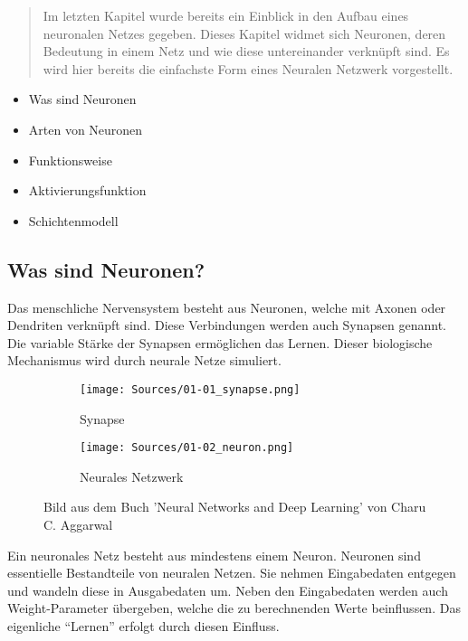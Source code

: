 \begin{tcolorbox}[title={Inhalt}]
    \begin{quotation}\noindent
        Im letzten Kapitel wurde bereits ein Einblick in den Aufbau eines neuronalen Netzes gegeben. 
        Dieses Kapitel widmet sich Neuronen, deren Bedeutung in einem Netz und wie diese untereinander verknüpft sind.
        Es wird hier bereits die einfachste Form eines Neuralen Netzwerk vorgestellt.
    \end{quotation}
\begin{itemize} 
    \item Was sind Neuronen
    \item Arten von Neuronen
    \item Funktionsweise
    \item Aktivierungsfunktion
    \item Schichtenmodell
\end{itemize} 
\end{tcolorbox}
\subsection{Was sind Neuronen?}\label{sec:neuronen:was_sind_neuronen}  
Das menschliche Nervensystem besteht aus Neuronen, welche mit Axonen oder Dendriten verknüpft sind. Diese Verbindungen werden auch Synapsen genannt. Die variable Stärke der Synapsen
ermöglichen das Lernen. Dieser biologische Mechanismus wird durch neurale Netze simuliert.\\

\begin{figure}[H]
\begin{subfigure}{0.6\textwidth}
    \texttt{[image: Sources/01-01\_synapse.png]}
    \label{Synapse}
    \caption{Synapse}
\end{subfigure}
\begin{subfigure}{0.25\textwidth}
    \texttt{[image: Sources/01-02\_neuron.png]}
    \label{Neuron}
    \caption{Neurales Netzwerk}
\end{subfigure}
\caption{Bild aus dem Buch 'Neural Networks and Deep Learning' von Charu C. Aggarwal
}
\end{figure}
\noindent
Ein neuronales Netz besteht aus mindestens einem Neuron. Neuronen sind essentielle Bestandteile von neuralen Netzen. Sie nehmen Eingabedaten entgegen und wandeln diese 
in Ausgabedaten um. Neben den Eingabedaten werden auch Weight-Parameter übergeben, welche die zu berechnenden Werte beinflussen. Das eigenliche \enquote{Lernen} erfolgt durch diesen 
Einfluss.
